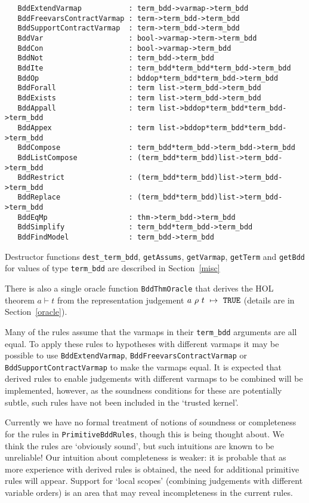 \documentclass[12pt]{article}
\renewcommand{\t}[1]{\mbox{\tt #1}}
\newcommand{\ml}[1]{{\tt #1}}
\newcommand{\termbdd}[4]{\mbox{$#1~#2~#3~\mapsto~#4$}}
\newcommand\termbddty{\texttt{term\_bdd}\xspace}
\begin{document}
{\footnotesize\baselineskip 10pt\begin{verbatim}
   BddExtendVarmap           : term_bdd->varmap->term_bdd
   BddFreevarsContractVarmap : term->term_bdd->term_bdd
   BddSupportContractVarmap  : term->term_bdd->term_bdd
   BddVar                    : bool->varmap->term->term_bdd
   BddCon                    : bool->varmap->term_bdd
   BddNot                    : term_bdd->term_bdd
   BddIte                    : term_bdd*term_bdd*term_bdd->term_bdd
   BddOp                     : bddop*term_bdd*term_bdd->term_bdd
   BddForall                 : term list->term_bdd->term_bdd
   BddExists                 : term list->term_bdd->term_bdd
   BddAppall                 : term list->bddop*term_bdd*term_bdd->term_bdd
   BddAppex                  : term list->bddop*term_bdd*term_bdd->term_bdd
   BddCompose                : term_bdd*term_bdd->term_bdd->term_bdd
   BddListCompose            : (term_bdd*term_bdd)list->term_bdd->term_bdd
   BddRestrict               : (term_bdd*term_bdd)list->term_bdd->term_bdd
   BddReplace                : (term_bdd*term_bdd)list->term_bdd->term_bdd
   BddEqMp                   : thm->term_bdd->term_bdd
   BddSimplify               : term_bdd*term_bdd->term_bdd
   BddFindModel              : term_bdd->term_bdd
\end{verbatim}}

Destructor functions \t{dest\_term\_bdd}, \t{getAssums}, \t{getVarmap}, \t{getTerm}
and \t{getBdd} for values of type \termbddty are described in Section~\ref{misc}

There is also a single oracle function
\t{BddThmOracle} that derives the HOL theorem $a \vdash t$
from the representation judgement \termbdd{a}{\rho}{t}{\ml{TRUE}}
(details are in Section~\ref{oracle}).

Many of the rules assume that the varmaps in their \termbddty
arguments are all equal. To apply these rules to hypotheses with
different varmaps it may be possible to use \t{BddExtendVarmap},
\t{BddFreevarsContractVarmap} or \t{BddSupportContractVarmap} to make
the varmaps equal.  It is expected that derived rules to enable
judgements with different varmaps to be combined will be implemented,
however, as the soundness conditions for these are potentially subtle,
such rules have not been included in the `trusted kernel'.

Currently we have no formal treatment of notions of soundness or
completeness for the rules in \t{PrimitiveBddRules}, though this is
being thought about. We think the rules are `obviously sound', but
such intuitions are known to be unreliable! Our intuition about
completeness is weaker: it is probable that as more experience with
derived rules is obtained, the need for additional primitive rules
will appear. Support for `local scopes' (combining judgements with
different variable orders) is an area that may reveal incompleteness
in the current rules.
\end{document}
